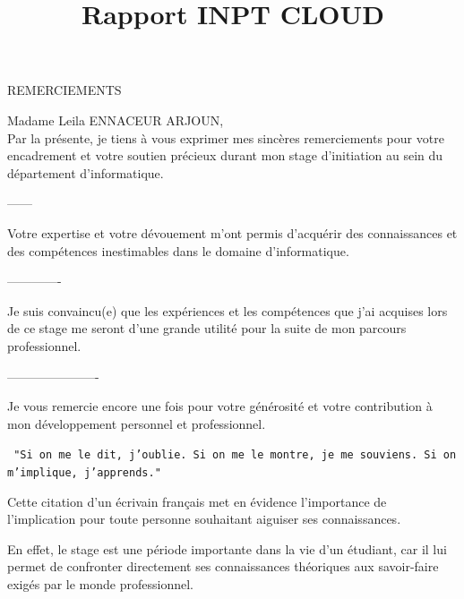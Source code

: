 \documentclass[12pt]{rapportINPTCLOUD}
\title{Rapport INPT CLOUD}
\begin{document}
	
	
	
	
	
	
	
	\fairemarges 
	\fairepagedegarde 
	\setlength{\baselineskip}{0.35in}
	\newpage
	\begin{center}
		\Huge{ REMERCIEMENTS }
	\end{center}
	\begin{center}
		Madame Leila ENNACEUR  ARJOUN,\\
	
	Par la présente, je tiens à vous exprimer mes sincères remerciements pour votre encadrement et votre soutien précieux durant mon stage d'initiation au sein du département d'informatique.
	
	------
	
	Votre expertise et votre dévouement m'ont permis d'acquérir des connaissances et des compétences inestimables dans le domaine d'informatique. 
	
	-------------
	
	Je suis convaincu(e) que les expériences et les compétences que j'ai acquises lors de ce stage me seront d'une grande utilité pour la suite de mon parcours professionnel.
	
	----------------------
	
	Je vous remercie encore une fois pour votre générosité et votre contribution à mon développement personnel et professionnel.
	
	\end{center}
	
	
	\tabledematieres %
	\listoffigures
	\newpage
\begin{center}
	\texttt{	"Si on me le dit, j’oublie. Si on me le montre, je me souviens. Si on m’implique, j’apprends."}
\end{center}
	
	Cette citation d’un écrivain français met en évidence l’importance de l’implication pour toute personne souhaitant aiguiser ses connaissances.
	
	En effet, le stage est une période importante dans la vie d’un étudiant, car il lui permet de confronter directement ses connaissances théoriques aux savoir-faire exigés par le monde professionnel.
	
\end{document}
